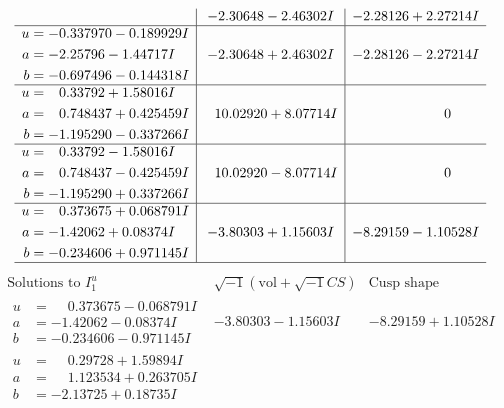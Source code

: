 \documentclass[1p]{elsarticle_modified}
\theoremstyle{definition}
\newcommand{\I}{\sqrt{-1}}
\begin{document}
$$\begin{array}{c|c|c}
 & -2.30648 - 2.46302 I & -2.28126 + 2.27214 I \\ \hline\begin{aligned}
u &= -0.337970 - 0.189929 I \\
a &= -2.25796 - 1.44717 I \\
b &= -0.697496 - 0.144318 I\end{aligned}
 & -2.30648 + 2.46302 I & -2.28126 - 2.27214 I \\ \hline\begin{aligned}
u &= \phantom{-}0.33792 + 1.58016 I \\
a &= \phantom{-}0.748437 + 0.425459 I \\
b &= -1.195290 - 0.337266 I\end{aligned}
 & \phantom{-}10.02920 + 8.07714 I & \phantom{-0.000000 } 0 \\ \hline\begin{aligned}
u &= \phantom{-}0.33792 - 1.58016 I \\
a &= \phantom{-}0.748437 - 0.425459 I \\
b &= -1.195290 + 0.337266 I\end{aligned}
 & \phantom{-}10.02920 - 8.07714 I & \phantom{-0.000000 } 0 \\ \hline\begin{aligned}
u &= \phantom{-}0.373675 + 0.068791 I \\
a &= -1.42062 + 0.08374 I \\
b &= -0.234606 + 0.971145 I\end{aligned}
 & -3.80303 + 1.15603 I & -8.29159 - 1.10528 I\\
 \hline 
 \end{array}$$\newpage$$\begin{array}{c|c|c}  
\text{Solutions to }I^u_{1}& \I (\text{vol} + \sqrt{-1}CS) & \text{Cusp shape}\\
 \hline 
\begin{aligned}
u &= \phantom{-}0.373675 - 0.068791 I \\
a &= -1.42062 - 0.08374 I \\
b &= -0.234606 - 0.971145 I\end{aligned}
 & -3.80303 - 1.15603 I & -8.29159 + 1.10528 I \\ \hline\begin{aligned}
u &= \phantom{-}0.29728 + 1.59894 I \\
a &= \phantom{-}1.123534 + 0.263705 I \\
b &= -2.13725 + 0.18735 I\end{aligned}

\end{array}$$
\end{document}
